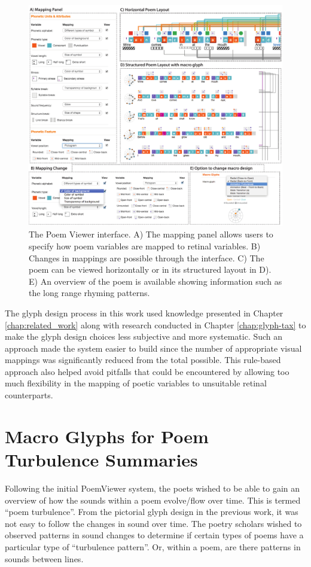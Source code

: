 \begin{figure}[h!]
\centering
\includegraphics[width=\textwidth]{images/other_glyphs/poemview_overview}
\caption{The Poem Viewer interface.
A) The mapping panel allows users to specify how poem variables are mapped to retinal variables.
B) Changes in mappings are possible through the interface.
C) The poem can be viewed horizontally or in its structured layout in D).
E) An overview of the poem is available showing information such as the long range rhyming patterns.}
\label{fig:poem_view_overview}
\end{figure}

The glyph design process in this work used knowledge presented in Chapter \ref{chap:related_work} along with research conducted in Chapter \ref{chap:glyph-tax} to make the glyph design choices less subjective and more systematic. 
Such an approach made the system easier to build since the number of appropriate visual mappings was significantly reduced from the total possible. 
This rule-based approach also helped avoid pitfalls that could be encountered by allowing too much flexibility in the mapping of poetic variables to unsuitable retinal counterparts.

\section{Macro Glyphs for Poem Turbulence Summaries}

Following the initial PoemViewer system, the poets wished to be able to gain an overview of how the sounds within a poem evolve/flow over time. 
This is termed ``poem turbulence''. 
From the pictorial glyph design in the previous work, it was not easy to follow the changes in sound over time.
The poetry scholars wished to observed patterns in sound changes to determine if certain types of poems have a particular type of ``turbulence pattern''. 
Or, within a poem, are there patterns in sounds between lines.

